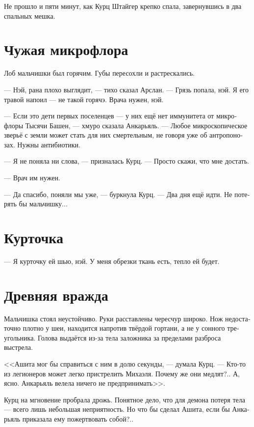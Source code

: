\documentclass[a4paper,10pt,fleqn]{book}\usepackage{polyglossia}\setdefaultlanguage[babelshorthands=true]{russian}\setotherlanguage{english}\defaultfontfeatures{Ligatures=TeX,Mapping=tex-text}\usepackage{xcolor}\newcommand{\ml}[3]{#2}
\begin{document}
Не прошло и пяти минут, как Курц Штайгер крепко спала, завернувшись в два спальных мешка.

\section{Чужая микрофлора}

Лоб мальчишки был горячим.
Губы пересохли и растрескались.

--- Нэй, рана плохо выглядит, --- тихо сказал Арслан.
--- Грязь попала, нэй.
Я его травой напоил --- не такой горячэ.
Врача нужен, нэй.

--- Если это дети первых поселенцев --- у них ещё нет иммунитета от микрофлоры Тысячи Башен, --- хмуро сказала Анкарьяль.
--- Любое микроскопическое зверьё с земли может стать для них смертельным, не говоря уже об антропонозах.
Нужны антибиотики.

--- Я не поняла ни слова, --- призналась Курц.
--- Просто скажи, что мне достать.

--- Врач им нужен.

--- Да спасибо, поняли мы уже, --- буркнула Курц.
--- Два дня ещё идти.
Не потерять бы мальчишку...

\section{Курточка}

--- Я курточку ей шью, нэй.
У меня обрезки ткань есть, тепло ей будет.

\section{Древняя вражда}

Мальчишка стоял неустойчиво.
Руки расставлены чересчур широко.
Нож недостаточно плотно у шеи, находится напротив твёрдой гортани, а не у сонного треугольника.
Голова выдаётся из-за тела заложника за пределами разброса выстрела.

\ml{$0$}
{<<Ашита мог бы справиться с ним в долю секунды, --- думала Курц.}
{\textit{Ashita could handle him in a split second,} Kurz thought.}
\ml{$0$}
{--- Кто-то из легионеров может легко пристрелить Михаэля.}
{\textit{One of the legionaires could easily shoot Michael.}}
\ml{$0$}
{Почему же они медлят?..}
{\textit{Why do they hesitate ...?}}
\ml{$0$}
{А, ясно.}
{\textit{Ah, I see.}}
\ml{$0$}
{Анкарьяль велела ничего не предпринимать>>.}
{\textit{Angaralle told no moves.}}

Курц на мгновение пробрала дрожь.
Понятное дело, что для демона потеря тела --- всего лишь небольшая неприятность.
Но что бы сделал Ашита, если бы Анкарьяль приказала ему пожертвовать собой?..
\end{document}
